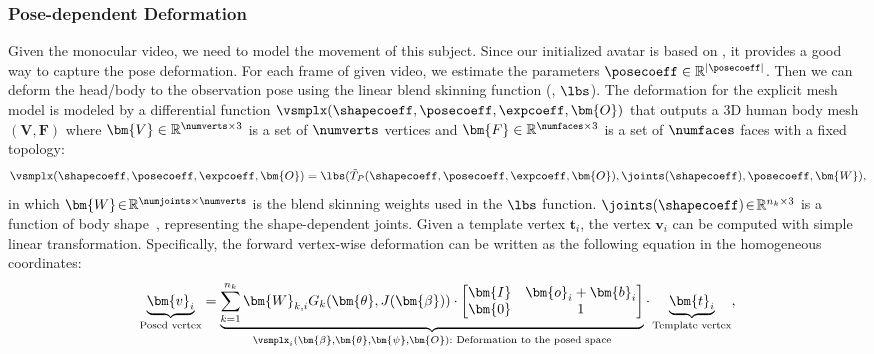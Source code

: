 \subsubsection{Pose-dependent Deformation} 
Given the monocular video, we need to model the movement of this subject. 
Since our initialized avatar is based on \smpl, it provides a good way to capture the pose deformation.
For each frame of given video, we estimate the \smpl parameters  $\posecoeff \in \mathbb{R}^{|\posecoeff|}$. 
Then we can deform the head/body to the observation pose using the linear blend skinning function (\ie, $\lbs$).  
The deformation for the explicit \smpl mesh model is modeled by a differential function $\vsmplx(\shapecoeff, \posecoeff, \expcoeff, \bm{O})$ that outputs a 3D human body mesh $(\bm{V},\bm{F})$ where $\bm{V}\in\mathbb{R}^{\numverts\times 3}$ is a set of $\numverts$ vertices and $\bm{F}\in\mathbb{R}^{\numfaces\times 3}$ is a set of $\numfaces$ faces with a fixed topology:
\begin{equation}
        \vsmplx(\shapecoeff, \posecoeff, \expcoeff, \bm{O}) =  \lbs(\tilde{T}_P(\shapecoeff, \posecoeff, \expcoeff, \bm{O}), \joints(\shapecoeff), \posecoeff, \bm{W}),
\end{equation}
in which $\thickmuskip=2mu \medmuskip=2mu \bm{W} \in \mathbb{R}^{\numjoints \times \numverts}$ is the blend skinning weights used in the $\lbs$ function. $\thickmuskip=2mu \medmuskip=2mu\joints(\shapecoeff)\in\mathbb{R}^{n_k\times 3}$ is a function of body shape~\cite{SMPL:2015}, representing the shape-dependent joints. Given a template vertex $\bm{t}_i$, the vertex $\bm{v}_i$ can be computed with simple linear transformation. Specifically, the forward vertex-wise deformation can be written as the following equation in the homogeneous coordinates:
\begin{equation}
\begin{aligned}
    \underbrace{\bm{v}_i}_{\textnormal{Posed vertex}} = \underbrace{\sum_{k=1}^{n_k}\bm{W}_{k,i}G_k(\bm{\theta},J(\bm{\beta}))\cdot
        \begin{bmatrix}
     \bm{I} &  \bm{o}_i+ \bm{b}_i \\
      \bm{0} &  1 
  \end{bmatrix}}_{\vsmplx_i(\bm{\beta},\bm{\theta},\bm{\psi},\bm{O})\textnormal{:~Deformation to the posed space}}\cdot\underbrace{\bm{t}_i}_{\textnormal{Template vertex}}\nonumber,
\end{aligned}
\end{equation}
